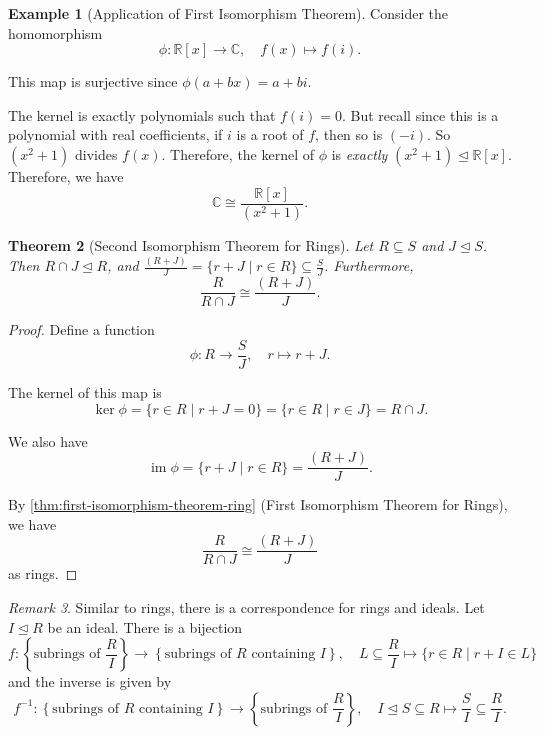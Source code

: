 \documentclass{article}
\newtheorem{theorem}{Theorem}[section]
\theoremstyle{definition}
\newtheorem{example}[theorem]{Example}
\theoremstyle{remark}
\newtheorem{remark}[theorem]{Remark}
\newcommand{\pqty}[1]{\left(#1\right)}
\newcommand{\bqty}[1]{\left[#1\right]}
\newcommand{\Bqty}[1]{\left\{#1\right\}}
\newcommand{\set}[2]{\{#1\mid #2\}}
\newcommand{\flatfrac}[2]{\frac{#1}{#2}}
\newcommand{\function}[5]{#1:#2\to #3,\quad #4\mapsto #5}
\newcommand{\inverse}{^{-1}}
\newcommand{\isomorphic}{\cong}
\newcommand{\subring}{\subseteq}
\newcommand{\idealsub}{\trianglelefteq}
\newcommand{\RR}{\mathbb{R}}
\newcommand{\CC}{\mathbb{C}}
\newcommand{\img}{\operatorname{im}}
\begin{document}
\begin{example}[Application of First Isomorphism Theorem]
    Consider the homomorphism
    \[
        \function{\phi}{\RR\bqty{x}}{\CC}{f\pqty{x}}{f\pqty{i}}.
    \]

    This map is surjective since \(\phi\pqty{a + bx} = a + bi\). 
    
    The kernel is exactly polynomials such that \(f\pqty{i} = 0\). But recall since this is a polynomial with real coefficients, if \(i\) is a root of \(f\), then so is \(\pqty{-i}\). So \(\pqty{x^2 + 1}\) divides \(f\pqty{x}\). Therefore, the kernel of \(\phi\) is \emph{exactly} \(\pqty{x^2 + 1} \idealsub \RR\bqty{x}\). Therefore, we have
    \[
        \CC \isomorphic \flatfrac{\RR\bqty{x}}{\pqty{x^2 + 1}}.
    \]
\end{example}

\begin{theorem}[Second Isomorphism Theorem for Rings]
    \label{thm:second-isomorphism-theorem-ring}%
    Let \(R \subring S\) and \(J \idealsub S\). Then \(R \cap J \idealsub R\), and \(\flatfrac{\pqty{R + J}}{J} = \set{r + J}{r \in R} \subring \flatfrac{S}{J}\). Furthermore,
    \[
        \flatfrac{R}{R \cap J} \isomorphic \flatfrac{\pqty{R + J}}{J}.
    \]
\end{theorem}

\begin{proof}
    Define a function
    \[
        \function{\phi}{R}{\flatfrac{S}{J}}{r}{r + J}.
    \]

    The kernel of this map is
    \[
        \ker \phi = \set{r \in R}{r + J = 0} = \set{r \in R}{r \in J} = R \cap J.
    \]

    We also have
    \[
        \img \phi = \set{r + J}{r \in R} = \flatfrac{\pqty{R + J}}{J}.
    \]

    By \autoref{thm:first-isomorphism-theorem-ring} (First Isomorphism Theorem for Rings), we have
    \[
        \flatfrac{R}{R \cap J} \isomorphic \flatfrac{\pqty{R + J}}{J}
    \]
    as rings.
\end{proof}

\begin{remark}
    Similar to rings, there is a correspondence for rings and ideals. Let \(I \idealsub R\) be an ideal. There is a bijection
    \[
        \function{f}{\Bqty{\text{subrings of }\flatfrac{R}{I}}}{\Bqty{\text{subrings of }R\text{ containing }I}}{L \subring \flatfrac{R}{I}}{\set{r \in R}{r + I \in L}}
    \]
    and the inverse is given by
    \[
        \function{f\inverse}{\Bqty{\text{subrings of }R\text{ containing }I}}{\Bqty{\text{subrings of }\flatfrac{R}{I}}}{I \idealsub S \subring R}{\flatfrac{S}{I} \subring \flatfrac{R}{I}.}
    \]
\end{remark}
\end{document}
